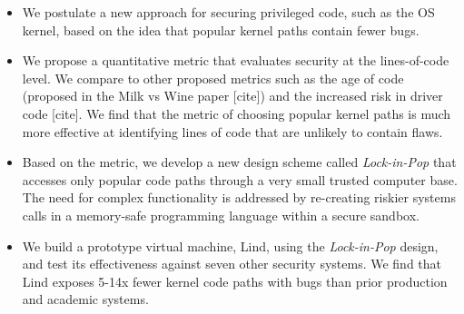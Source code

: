 \begin{itemize}\setlength\itemsep{0em}
\item
We postulate a new approach for securing privileged code,
such as the OS kernel, based on the idea that popular kernel paths contain 
fewer bugs.  

\item
We propose a quantitative metric that evaluates security at the lines-of-code 
 level.  We compare to other proposed metrics
such as the age of code (proposed in the Milk vs Wine paper [cite]) and
the increased risk in driver code [cite].  We find that the metric of
choosing popular kernel paths is much more effective at identifying lines of
code that are unlikely to contain flaws.

\item
Based on the metric, we develop a new design scheme called \emph{Lock-in-Pop} that
accesses only popular code paths
through a very small trusted computer base.
The need for complex functionality is addressed by re-creating riskier systems calls
in a memory-safe programming language within a secure sandbox.

\item
We build a prototype virtual machine, Lind, using the \emph{Lock-in-Pop} design,
 and test its effectiveness against seven other security systems. We find that
Lind exposes 5-14x fewer kernel code paths with bugs than prior production and
academic systems.
\end{itemize}


